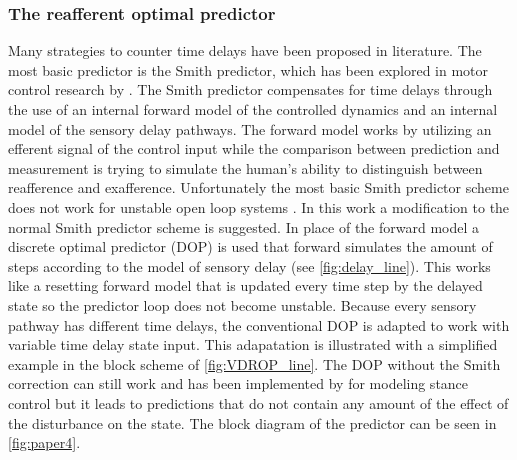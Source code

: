 \subsubsection{The reafferent optimal predictor}
Many strategies to counter time delays have been proposed in literature. The most basic predictor is the Smith predictor, which has been explored in motor control research by \citet{miall1993cerebellum}. The Smith predictor compensates for time delays through the use of an internal forward model of the controlled dynamics and an internal model of the sensory delay pathways. The forward model works by utilizing an efferent signal of the control input while the comparison between prediction and measurement is trying to simulate the human's ability to distinguish between reafference and exafference.  Unfortunately the  most basic Smith predictor scheme does not work for unstable open loop systems \cite{smith1957closed}. In this work a modification to the normal Smith predictor scheme is suggested. In place of the forward model a discrete optimal predictor  (DOP) is used that forward simulates the amount of steps according to the model of sensory delay (see \cref{fig:delay_line}). This works like a resetting forward model that is updated every time step by the delayed state so the predictor loop does not become unstable. Because every sensory pathway has different time delays, the conventional DOP is adapted to work with variable time delay state input. This adapatation is illustrated with a simplified example in the block scheme of \cref{fig:VDROP_line}.  The DOP   without the Smith  correction can still work and has been implemented by \citet{van2001adaptive} for modeling stance control but it leads to predictions that do not contain any amount of the effect of the disturbance on the state. The block diagram of the predictor can be seen in \cref{fig:paper4}.

